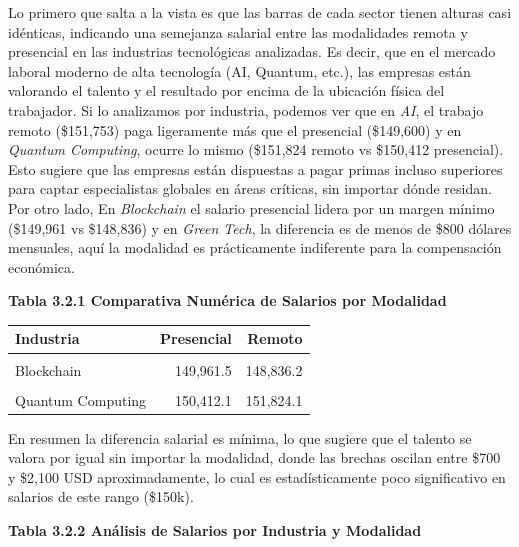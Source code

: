 \documentclass[oneside,11pt]{Latex/Classes/PhDthesisPSnPDF}
\begin{document}
Lo primero que salta a la vista es que las barras de cada sector tienen
alturas casi idénticas, indicando una semejanza salarial entre las
modalidades remota y presencial en las industrias tecnológicas
analizadas. Es decir, que en el mercado laboral moderno de alta
tecnología (AI, Quantum, etc.), las empresas están valorando el talento
y el resultado por encima de la ubicación física del trabajador. Si lo
analizamos por industria, podemos ver que en \emph{AI}, el trabajo
remoto (\$151,753) paga ligeramente más que el presencial (\$149,600) y
en \emph{Quantum Computing}, ocurre lo mismo (\$151,824 remoto vs
\$150,412 presencial). Esto sugiere que las empresas están dispuestas a
pagar primas incluso superiores para captar especialistas globales en
áreas críticas, sin importar dónde residan. Por otro lado, En
\emph{Blockchain} el salario presencial lidera por un margen mínimo
(\$149,961 vs \$148,836) y en \emph{Green Tech}, la diferencia es de
menos de \$800 dólares mensuales, aquí la modalidad es prácticamente
indiferente para la compensación económica.

\newpage

\begin{center}
\textbf{Tabla 3.2.1 Comparativa Numérica de Salarios por Modalidad}
\end{center}

\begin{table}[!h]
\centering
\begin{tabular}{lrr}
\toprule
Industria & Presencial & Remoto\\
\midrule
\cellcolor{gray!10}{AI} & \cellcolor{gray!10}{151,753.3} & \cellcolor{gray!10}{149,600.1}\\
Blockchain & 149,961.5 & 148,836.2\\
\cellcolor{gray!10}{Green Tech} & \cellcolor{gray!10}{149,726.1} & \cellcolor{gray!10}{148,951.1}\\
Quantum Computing & 150,412.1 & 151,824.1\\
\bottomrule
\end{tabular}
\end{table}

En resumen la diferencia salarial es mínima, lo que sugiere que el
talento se valora por igual sin importar la modalidad, donde las brechas
oscilan entre \$700 y \$2,100 USD aproximadamente, lo cual es
estadísticamente poco significativo en salarios de este rango (\$150k).

\begin{center}
\textbf{Tabla 3.2.2 Análisis de Salarios por Industria y Modalidad}
\end{center}
\end{document}

